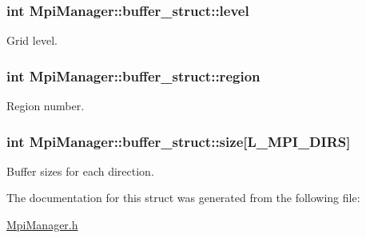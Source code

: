 \subsubsection[{\texorpdfstring{level}{level}}]{\setlength{\rightskip}{0pt plus 5cm}int Mpi\+Manager\+::buffer\+\_\+struct\+::level}\hypertarget{struct_mpi_manager_1_1buffer__struct_adc6bb3b15665e3fb5834e6134395e1f9}{}\label{struct_mpi_manager_1_1buffer__struct_adc6bb3b15665e3fb5834e6134395e1f9}


Grid level. 

\subsubsection[{\texorpdfstring{region}{region}}]{\setlength{\rightskip}{0pt plus 5cm}int Mpi\+Manager\+::buffer\+\_\+struct\+::region}\hypertarget{struct_mpi_manager_1_1buffer__struct_a81730a85a03630880e8c378fcb8d3298}{}\label{struct_mpi_manager_1_1buffer__struct_a81730a85a03630880e8c378fcb8d3298}


Region number. 

\subsubsection[{\texorpdfstring{size}{size}}]{\setlength{\rightskip}{0pt plus 5cm}int Mpi\+Manager\+::buffer\+\_\+struct\+::size\mbox{[}{\bf L\+\_\+\+M\+P\+I\+\_\+\+D\+I\+RS}\mbox{]}}\hypertarget{struct_mpi_manager_1_1buffer__struct_a1d38a439ae551da0a708d7a8b39f5c76}{}\label{struct_mpi_manager_1_1buffer__struct_a1d38a439ae551da0a708d7a8b39f5c76}


Buffer sizes for each direction. 



The documentation for this struct was generated from the following file\+:\begin{DoxyCompactItemize}
\item 
\hyperlink{_mpi_manager_8h}{Mpi\+Manager.\+h}\end{DoxyCompactItemize}
